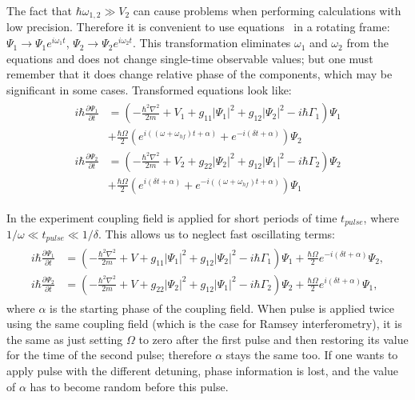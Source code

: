 The fact that $\hbar \omega_{1,2} \gg V_2$ can cause problems when performing calculations with low precision.
Therefore it is convenient to use equations~
in a rotating frame:
$\Psi_1 \rightarrow \Psi_1 e^{i \omega_1 t}$, $\Psi_2 \rightarrow \Psi_2 e^{i \omega_2 t}$.
This transformation eliminates $\omega_1$ and $\omega_2$ from the equations and does not change single-time observable values;
but one must remember that it does change relative phase of the components, which may be significant in some cases.
Transformed equations look like:
\begin{align*}
\begin{split}
	i \hbar \frac{\partial \Psi_1}{\partial t} & = \left(
		-\frac{\hbar^2 \nabla^2}{2 m} + V_1
		+ g_{11} \lvert \Psi_1 \rvert^2
		+ g_{12} \lvert \Psi_2 \rvert^2
		- i \hbar \Gamma_1
	\right) \Psi_1 \\
	& + \frac{\hbar \Omega}{2} \left(
		e^{i ((\omega + \omega_{hf}) t + \alpha)} + e^{-i (\delta t + \alpha)}
	\right) \Psi_2 \\
	i \hbar \frac{\partial \Psi_2}{\partial t} & = \left(
		-\frac{\hbar^2 \nabla^2}{2 m} + V_2
		+ g_{22} \lvert \Psi_2 \rvert^2
		+ g_{12} \lvert \Psi_1 \rvert^2
		- i \hbar \Gamma_2
	\right) \Psi_2 \\
	& + \frac{\hbar \Omega}{2} \left(
		e^{i (\delta t + \alpha)} + e^{-i ((\omega + \omega_{hf}) t + \alpha)}
	\right) \Psi_1
\end{split}
\end{align*}

In the experiment coupling field is applied for short periods of time $t_{pulse}$,
where $1 / \omega \ll t_{pulse} \ll 1 / \delta$.
This allows us to neglect fast oscillating terms:
\begin{align}
\label{eqn:mean-field:cgpes_simplified}
\begin{split}
	i \hbar \frac{\partial \Psi_1}{\partial t} & = \left(
		-\frac{\hbar^2 \nabla^2}{2 m} + V
		+ g_{11} \lvert \Psi_1 \rvert^2
		+ g_{12} \lvert \Psi_2 \rvert^2
		- i \hbar \Gamma_1
	\right) \Psi_1
	+ \frac{\hbar \Omega}{2} e^{-i (\delta t + \alpha)} \Psi_2, \\
	i \hbar \frac{\partial \Psi_2}{\partial t} & = \left(
		-\frac{\hbar^2 \nabla^2}{2 m} + V
		+ g_{22} \lvert \Psi_2 \rvert^2
		+ g_{12} \lvert \Psi_1 \rvert^2
		- i \hbar \Gamma_2
	\right) \Psi_2 +
	\frac{\hbar \Omega}{2} e^{i (\delta t + \alpha)} \Psi_1,
\end{split}
\end{align}
where $\alpha$ is the starting phase of the coupling field.
When pulse is applied twice using the same coupling field (which is the case for Ramsey interferometry),
it is the same as just setting $\Omega$ to zero after the first pulse and then restoring its value for the time of the second pulse;
therefore $\alpha$ stays the same too.
If one wants to apply pulse with the different detuning, phase information is lost,
and the value of $\alpha$ has to become random before this pulse.

